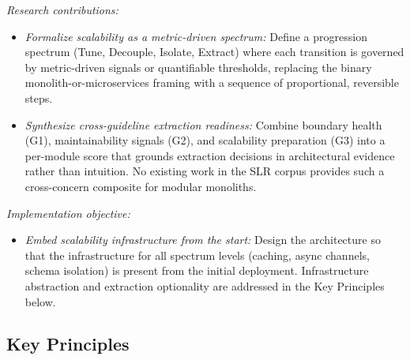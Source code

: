 \emph{Research contributions:}
\begin{itemize}[itemsep=8pt,topsep=2pt]
  \item \emph{Formalize scalability as a metric-driven spectrum:} Define a progression spectrum (Tune, Decouple, Isolate, Extract) where each transition is governed by metric-driven signals or quantifiable thresholds, replacing the binary monolith-or-microservices framing with a sequence of proportional, reversible steps.
  \item \emph{Synthesize cross-guideline extraction readiness:} Combine boundary health (G1), maintainability signals (G2), and scalability preparation (G3) into a per-module score that grounds extraction decisions in architectural evidence rather than intuition. No existing work in the SLR corpus provides such a cross-concern composite for modular monoliths.
\end{itemize}

\emph{Implementation objective:}
\begin{itemize}[itemsep=8pt,topsep=2pt]
  \item \emph{Embed scalability infrastructure from the start:} Design the architecture so that the infrastructure for all spectrum levels (caching, async channels, schema isolation) is present from the initial deployment. Infrastructure abstraction and extraction optionality are addressed in the Key Principles below.
\end{itemize}


\subsection*{Key Principles}

